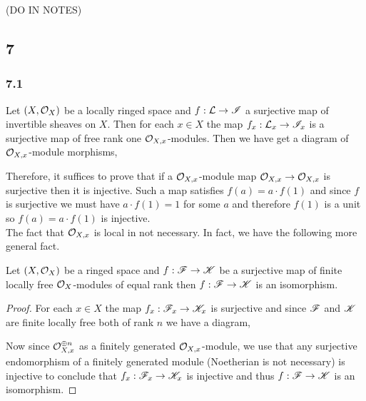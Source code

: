 \documentclass[12pt]{article}
\begin{document}
(DO IN NOTES)

\subsection{7}

\subsubsection{7.1}

Let $(X, \mathcal{O}_{X})$ be a locally ringed space and $f : \mathcal{L} \to \mathscr{I}$ a surjective map of invertible sheaves on $X$. Then for each $x \in X$ the map $f_x : \mathcal{L}_x \to \mathscr{I}_x$ is a surjective map of free rank one $\mathcal{O}_{X, x}$-modules. Then we have get a diagram of $\mathcal{O}_{X, x}$-module morphisms,
\begin{center}
\end{center}
Therefore, it suffices to prove that if a $\mathcal{O}_{X, x}$-module map $\mathcal{O}_{X, x} \to \mathcal{O}_{X, x}$ is surjective then it is injective. Such a map satisfies $f(a) = a \cdot f(1)$ and since $f$ is surjective we must have $a \cdot f(1) = 1$ for some $a$ and therefore $f(1)$ is a unit so $f(a) = a \cdot f(1)$ is injective.
\bigskip\\
The fact that $\mathcal{O}_{X, x}$ is local in not necessary. In fact, we have the following more general fact.

\begin{theorem}
Let $(X, \mathcal{O}_{X})$ be a ringed space and $f : \mathscr{F} \to \mathscr{K}$ be a surjective map of finite locally free $\mathcal{O}_{X}$-modules of equal rank then $f : \mathscr{F} \to \mathscr{K}$ is an isomorphism. 
\end{theorem}

\begin{proof}
For each $x \in X$ the map $f_x : \mathscr{F}_x \to \mathscr{K}_x$ is surjective and since $\mathscr{F}$ and $\mathscr{K}$ are finite locally free both of rank $n$ we have a diagram,
\begin{center}
\end{center}
Now since $\mathcal{O}_{X, x}^{\oplus n}$ as a finitely generated $\mathcal{O}_{X, x}$-module,  we use that any surjective endomorphism of a finitely generated module (Noetherian is not necessary) is injective to conclude that $f_x : \mathscr{F}_x \to \mathscr{K}_x$ is injective and thus $f : \mathscr{F} \to \mathscr{K}$ is an isomorphism. 
\end{proof}
\end{document}
